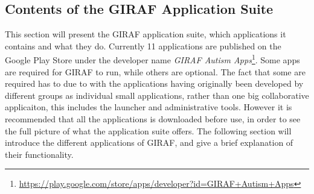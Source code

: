 \subsection{Contents of the GIRAF Application Suite}
This section will present the GIRAF application suite, which applications it contains and what they do.
Currently 11 applications are published on the Google Play Store under the developer name \textit{GIRAF Autism Apps}\footnote{\url{https://play.google.com/store/apps/developer?id=GIRAF+Autism+Apps}}.
Some apps are required for GIRAF to run, while others are optional.
The fact that some are required has to due to with the applications having originally been developed by different groups as individual small applications, rather than one big collaborative applicaiton, this includes the launcher and administrative tools.
However it is recommended that all the applications is downloaded before use, in order to see the full picture of what the application suite offers.
The following section will introduce the different applications of GIRAF, and give a brief explanation of their functionality.
